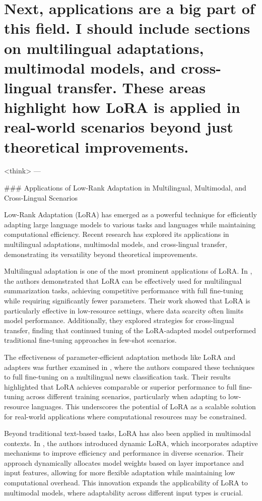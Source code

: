 \documentclass[conference]{IEEEtran}
\begin{document}
\section{Next, applications are a big part of this field. I should include sections on multilingual adaptations, multimodal models, and cross-lingual transfer. These areas highlight how LoRA is applied in real-world scenarios beyond just theoretical improvements.}
<think>
---

### Applications of Low-Rank Adaptation in Multilingual, Multimodal, and Cross-Lingual Scenarios

Low-Rank Adaptation (LoRA) has emerged as a powerful technique for efficiently adapting large language models to various tasks and languages while maintaining computational efficiency. Recent research has explored its applications in multilingual adaptations, multimodal models, and cross-lingual transfer, demonstrating its versatility beyond theoretical improvements.

Multilingual adaptation is one of the most prominent applications of LoRA. In \cite{b2}, the authors demonstrated that LoRA can be effectively used for multilingual summarization tasks, achieving competitive performance with full fine-tuning while requiring significantly fewer parameters. Their work showed that LoRA is particularly effective in low-resource settings, where data scarcity often limits model performance. Additionally, they explored strategies for cross-lingual transfer, finding that continued tuning of the LoRA-adapted model outperformed traditional fine-tuning approaches in few-shot scenarios.

The effectiveness of parameter-efficient adaptation methods like LoRA and adapters was further examined in \cite{b3}, where the authors compared these techniques to full fine-tuning on a multilingual news classification task. Their results highlighted that LoRA achieves comparable or superior performance to full fine-tuning across different training scenarios, particularly when adapting to low-resource languages. This underscores the potential of LoRA as a scalable solution for real-world applications where computational resources may be constrained.

Beyond traditional text-based tasks, LoRA has also been applied in multimodal contexts. In \cite{b4}, the authors introduced dynamic LoRA, which incorporates adaptive mechanisms to improve efficiency and performance in diverse scenarios. Their approach dynamically allocates model weights based on layer importance and input features, allowing for more flexible adaptation while maintaining low computational overhead. This innovation expands the applicability of LoRA to multimodal models, where adaptability across different input types is crucial.
\end{document}
